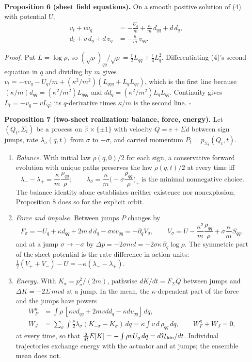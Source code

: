 \documentclass[11pt,a4paper]{article}
\begin{document}
\textbf{Proposition 6 (sheet field equations).} On a smooth positive
solution of (4) with potential \(U\), \[\begin{aligned}
v_t+vv_q&=-\frac{U_q}{m}+\frac\kappa m\,d_{qq}+d\,d_q,\\
d_t+v\,d_q+d\,v_q&=-\frac\kappa m\,v_{qq}.
\end{aligned}\tag{25}\]

\emph{Proof.} Put \(L=\log\rho\), so
\((\sqrt\rho)_{qq}/\sqrt\rho =\tfrac12L_{qq}+\tfrac14L_q^2\).
Differentiating (4)'s second equation in \(q\) and dividing by \(m\)
gives \(v_t=-vv_q-U_q/m+(\kappa^2/m^2)(L_{qqq}+L_qL_{qq})\), which is
the first line because \((\kappa/m)d_{qq}=(\kappa^2/m^2)L_{qqq}\) and
\(dd_q=(\kappa^2/m^2)L_qL_{qq}\). Continuity gives \(L_t=-v_q-vL_q\);
its \(q\)-derivative times \(\kappa/m\) is the second line. \(\square\)

\textbf{Proposition 7 (two-sheet realization: balance, force, energy).}
Let \((Q_t,\Sigma_t)\) be a process on \(\mathbb R\times\{\pm1\}\) with
velocity \(\dot Q=v+\Sigma d\) between sign jumps, rate
\(\lambda_\sigma(q,t)\) from \(\sigma\) to \(-\sigma\), and carried
momentum \(P_t=p_{\Sigma_t}(Q_t,t)\).

\begin{enumerate}
\def\labelenumi{(\roman{enumi})}
\item
  \emph{Balance.} With initial law \(\rho(q,0)/2\) for each sign, a
  conservative forward evolution with unique paths preserves the law
  \(\rho(q,t)/2\) at every time iff
  \[\lambda_--\lambda_+=\frac\kappa m\frac{\rho_{qq}}{\rho};\qquad
  \lambda_\sigma=\frac\kappa m\Big(-\sigma\frac{\rho_{qq}}{\rho}\Big)_+
  \ \text{is the minimal nonnegative choice.}\tag{26}\] The balance
  identity alone establishes neither existence nor nonexplosion;
  Proposition 8 does so for the explicit orbit.
\item
  \emph{Force and impulse.} Between jumps \(P\) changes by
  \[F_\sigma=-U_q+\kappa d_{qq}+2m\,d\,d_q-\sigma\kappa v_{qq}
  =-\partial_qV_\sigma,\qquad
  V_\sigma=U-\frac{\kappa^2}{m}\frac{\rho_{qq}}{\rho}
  +\sigma\frac\kappa m S_{qq},\tag{27}\] and at a jump
  \(\sigma\to-\sigma\) by
  \(\Delta p=-2\sigma md=-2\sigma\kappa\,\partial_q\log\rho\). The
  symmetric part of the sheet potential is the rate difference in action
  units: \(\tfrac12(V_++V_-)-U=-\kappa(\lambda_--\lambda_+)\).
\item
  \emph{Energy.} With \(K_\sigma=p_\sigma^2/(2m)\), pathwise
  \(dK/dt=F_\Sigma\dot Q\) between jumps and \(\Delta K=-2\Sigma\,mvd\)
  at a jump. In the mean, the \(\kappa\)-dependent part of the force and
  the jumps have powers \[\begin{aligned}
  W_F^{\kappa}&=\int\rho\,[\kappa v d_{qq}+2mv d d_q-\kappa d v_{qq}]\,dq,\\
  W_J&=\sum_\sigma\int\frac\rho2\lambda_\sigma(K_{-\sigma}-K_\sigma)\,dq
   =\kappa\int v\,d\,\rho_{qq}\,dq,\qquad W_F^{\kappa}+W_J=0,
  \end{aligned}\tag{28}\] at every time, so that
  \(\frac{d}{dt}E[K]=-\int\rho vU_q\,dq =d\mathcal H_{\rm kin}/dt\).
  Individual trajectories exchange energy with the actuator and at
  jumps; the ensemble mean does not.
\end{enumerate}
\end{document}
